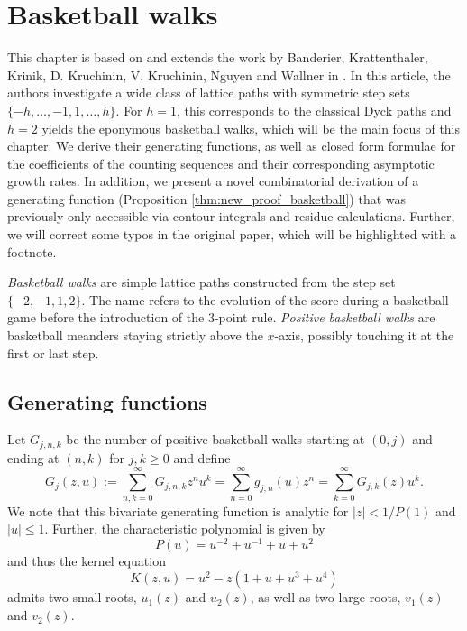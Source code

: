 \chapter{Basketball walks}
\label{chapter:basketball_walks}

This chapter is based on and extends the work by Banderier, Krattenthaler, Krinik, D. Kruchinin, V. Kruchinin, Nguyen and Wallner in \cite{Basketball}. 
In this article, the authors investigate a wide class of lattice paths with symmetric step sets $\{-h,\dots,-1,1,\dots,h\}$. 
For $h = 1$, this corresponds to the classical Dyck paths and $h = 2$ yields the eponymous basketball walks, which will be the main focus of this chapter. 
We derive their generating functions, as well as closed form formulae for the coefficients of the counting sequences and their corresponding asymptotic growth rates. In addition, we present a novel combinatorial derivation of a generating function (Proposition \ref{thm:new_proof_basketball}) that was previously only accessible via contour integrals and residue calculations.
Further, we will correct some typos in the original paper, which will be highlighted with a footnote.

\begin{definition}
  \textit{Basketball walks} are simple lattice paths constructed from the step set $\{-2,-1,1,2\}$. The name refers to the evolution of the score during a basketball game before the introduction of the 3-point rule.
  \textit{Positive basketball walks} are basketball meanders staying strictly above the $x$-axis, possibly touching it at the first or last step.
\end{definition}

\section{Generating functions}

Let $G_{j,n,k}$ be the number of positive basketball walks starting at $(0,j)$ and ending at $(n,k)$ for $j,k \geq 0$ and define
\begin{equation*}
  G_j(z,u) := \sum_{n,k = 0}^\infty G_{j,n,k} z^n u^k
  = \sum_{n = 0}^\infty g_{j,n}(u)z^n = \sum_{k = 0}^\infty G_{j,k}(z)u^k.
\end{equation*}
We note that this bivariate generating function is analytic for $|z| < 1/P(1)$ and $|u| \leq 1$. Further, the characteristic polynomial is given by
$$
  P(u) = u^{-2} + u^{-1} + u + u^2
$$
and thus the kernel equation 
\begin{equation}\label{eq:kernel_basketball}
  K(z,u) = u^2 - z(1 + u + u^3 + u^4)
\end{equation}
admits two small roots, $u_1(z)$ and $u_2(z)$, as well as two large roots, $v_1(z)$ and $v_2(z)$.

